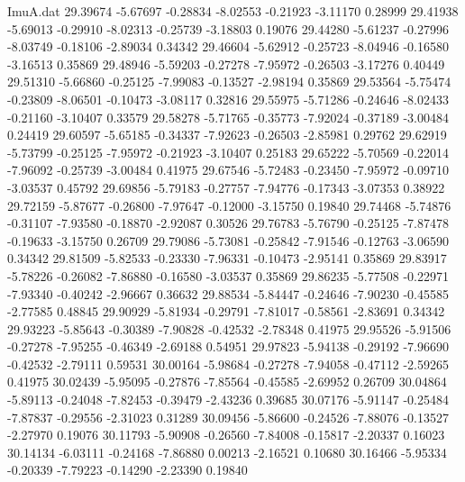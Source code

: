 \begin{filecontents}{ImuA.dat}
  29.39674   -5.67697   -0.28834   -8.02553   -0.21923   -3.11170    0.28999
  29.41938   -5.69013   -0.29910   -8.02313   -0.25739   -3.18803    0.19076
  29.44280   -5.61237   -0.27996   -8.03749   -0.18106   -2.89034    0.34342
  29.46604   -5.62912   -0.25723   -8.04946   -0.16580   -3.16513    0.35869
  29.48946   -5.59203   -0.27278   -7.95972   -0.26503   -3.17276    0.40449
  29.51310   -5.66860   -0.25125   -7.99083   -0.13527   -2.98194    0.35869
  29.53564   -5.75474   -0.23809   -8.06501   -0.10473   -3.08117    0.32816
  29.55975   -5.71286   -0.24646   -8.02433   -0.21160   -3.10407    0.33579
  29.58278   -5.71765   -0.35773   -7.92024   -0.37189   -3.00484    0.24419
  29.60597   -5.65185   -0.34337   -7.92623   -0.26503   -2.85981    0.29762
  29.62919   -5.73799   -0.25125   -7.95972   -0.21923   -3.10407    0.25183
  29.65222   -5.70569   -0.22014   -7.96092   -0.25739   -3.00484    0.41975
  29.67546   -5.72483   -0.23450   -7.95972   -0.09710   -3.03537    0.45792
  29.69856   -5.79183   -0.27757   -7.94776   -0.17343   -3.07353    0.38922
  29.72159   -5.87677   -0.26800   -7.97647   -0.12000   -3.15750    0.19840
  29.74468   -5.74876   -0.31107   -7.93580   -0.18870   -2.92087    0.30526
  29.76783   -5.76790   -0.25125   -7.87478   -0.19633   -3.15750    0.26709
  29.79086   -5.73081   -0.25842   -7.91546   -0.12763   -3.06590    0.34342
  29.81509   -5.82533   -0.23330   -7.96331   -0.10473   -2.95141    0.35869
  29.83917   -5.78226   -0.26082   -7.86880   -0.16580   -3.03537    0.35869
  29.86235   -5.77508   -0.22971   -7.93340   -0.40242   -2.96667    0.36632
  29.88534   -5.84447   -0.24646   -7.90230   -0.45585   -2.77585    0.48845
  29.90929   -5.81934   -0.29791   -7.81017   -0.58561   -2.83691    0.34342
  29.93223   -5.85643   -0.30389   -7.90828   -0.42532   -2.78348    0.41975
  29.95526   -5.91506   -0.27278   -7.95255   -0.46349   -2.69188    0.54951
  29.97823   -5.94138   -0.29192   -7.96690   -0.42532   -2.79111    0.59531
  30.00164   -5.98684   -0.27278   -7.94058   -0.47112   -2.59265    0.41975
  30.02439   -5.95095   -0.27876   -7.85564   -0.45585   -2.69952    0.26709
  30.04864   -5.89113   -0.24048   -7.82453   -0.39479   -2.43236    0.39685
  30.07176   -5.91147   -0.25484   -7.87837   -0.29556   -2.31023    0.31289
  30.09456   -5.86600   -0.24526   -7.88076   -0.13527   -2.27970    0.19076
  30.11793   -5.90908   -0.26560   -7.84008   -0.15817   -2.20337    0.16023
  30.14134   -6.03111   -0.24168   -7.86880    0.00213   -2.16521    0.10680
  30.16466   -5.95334   -0.20339   -7.79223   -0.14290   -2.23390    0.19840

\end{filecontents}
